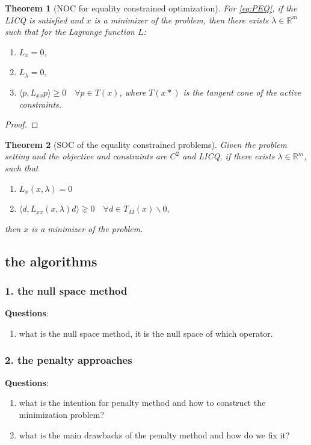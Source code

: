 \documentclass[a4paper,11pt,fleqn, draft]{book}
\newtheorem{theorem}{Theorem}[section]
\theoremstyle{definition}
\theoremstyle{remark}
\newcommand{\R}{\mathbb{R}}
\begin{document}
\begin{theorem}[NOC for equality constrained optimization]
For \eqref{eq:PEQ}, if the LICQ is satisfied and $x$ is a minimizer of the problem, then there exists $\lambda \in \R^m$ such that for the Lagrange function $L$:
\begin{enumerate}
	\item $ L_x = 0 $,
	\item $ L_\lambda = 0 $,
	\item $ \langle p , L_{xx} p \rangle \ge 0 \quad \forall p \in T(x) $, where $T(x*)$ is the tangent cone of the active constraints. 
\end{enumerate}
\end{theorem}
\begin{proof}
\end{proof}

\begin{theorem}[SOC of the equality constrained problems]
	Given the problem setting and the objective and constraints are $C^2$ and LICQ, if there exists $\lambda \in \R^m$, such that
	\begin{enumerate}
		\item $L_x ( x, \lambda) = 0 $
		\item $\langle d, L_{xx}(x, \lambda) d \rangle \gneq 0 \quad \forall d \in T_M(x) \backslash 0,$
	\end{enumerate}
	then $x$ is a minimizer of the problem. 
	
\end{theorem}


\subsection{the algorithms}
\subsubsection{1. the null space method}
\textbf{Questions}: 
\begin{enumerate}
	\item what is the null space method, it is the null space of which operator. 
\end{enumerate}


\subsubsection{2. the penalty approaches}
\textbf{Questions}:
\begin{enumerate}
	\item what is the intention for penalty method and how to construct the minimization problem?
	\item what is the main drawbacks of the penalty method and how do we fix it?
\end{enumerate}
\end{document}
